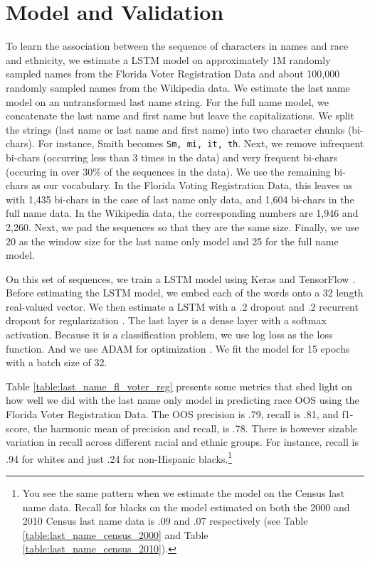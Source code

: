 \documentclass[12pt, letterpaper]{article}
\begin{document}
\section*{Model and Validation}
To learn the association between the sequence of characters in names and race and ethnicity, we estimate a LSTM model \citep{graves2005framewise, gers1999learning} on approximately 1M randomly sampled names from the Florida Voter Registration Data and about 100,000 randomly sampled names from the Wikipedia data. We estimate the last name model on an untransformed last name string. For the full name model, we concatenate the last name and first name but leave the capitalizations. We split the strings (last name or last name and first name) into two character chunks (bi-chars). For instance, Smith becomes {\tt Sm, mi, it, th}. Next, we remove infrequent bi-chars (occurring less than 3 times in the data) and very frequent bi-chars (occuring in over 30\% of the sequences in the data). We use the remaining bi-chars as our vocabulary. In the Florida Voting Registration Data, this leaves us with 1,435 bi-chars in the case of last name only data, and 1,604 bi-chars in the full name data. In the Wikipedia data, the corresponding numbers are 1,946 and 2,260. Next, we pad the sequences so that they are the same size. Finally, we use 20 as the window size for the last name only model and 25 for the full name model. 

On this set of sequences, we train a LSTM model using Keras \citep{chollet2015keras} and TensorFlow \citep{abadi2016tensorflow}. Before estimating the LSTM model, we embed each of the words onto a 32 length real-valued vector. We then estimate a LSTM with a .2 dropout and .2 recurrent dropout for regularization \citep{srivastava2014dropout}. The last layer is a dense layer with a softmax activation. Because it is a classification problem, we use log loss as the loss function. And we use ADAM for optimization \citep{kingma2014adam}. We fit the model for 15 epochs with a batch size of 32.

Table \ref{table:last_name_fl_voter_reg} presents some metrics that shed light on how well we did with the last name only model in predicting race OOS using the Florida Voter Registration Data. The OOS precision is .79, recall is .81, and f1-score, the harmonic mean of precision and recall, is .78. There is however sizable variation in recall across different racial and ethnic groups. For instance, recall is .94 for whites and just .24 for non-Hispanic blacks.\footnote{You see the same pattern when we estimate the model on the Census last name data. Recall for blacks on the model estimated on both the 2000 and 2010 Census last name data is .09 and .07 respectively (see Table \ref{table:last_name_census_2000} and Table \ref{table:last_name_census_2010}).}
\end{document}
